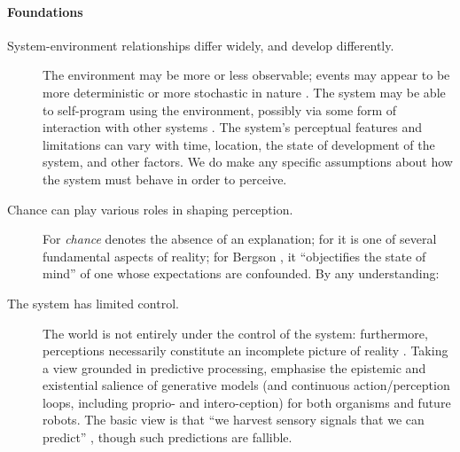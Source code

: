 
\paragraph{\textbf{\upshape Foundations}}

\begin{description}
\item[System-environment relationships differ widely, and develop
  differently.]  The environment may be more or less observable;
  events may appear to be more deterministic or more stochastic in
  nature \cite[pp.~42--44]{russel2003artificial}. The system may be
  able to self-program using the environment, possibly via some form
  of interaction with other systems
  \cite[esp.~p.~234]{clark1998being}.  The system's perceptual
  features and limitations can vary with time, location, the state of
  development of the system, and other factors.  We do make any
  specific assumptions about how the system must behave in order to
  perceive.
\item[Chance can play various roles in shaping perception.] For
  \citet[p.~99]{hume1904enquiry} \emph{chance} denotes the absence of
  an explanation; for \citet{peirce1931necessity} it is one of several
  fundamental aspects of reality; for Bergson
  \cite[p.~234]{bergson1983creative}, it ``objectifies the state of
  mind'' of one whose expectations are confounded.  By any
  understanding:
\item[The system has limited control.] The world is not entirely under
  the control of the system:
  furthermore,
  perceptions necessarily constitute an incomplete picture of reality
  \cite{hoffman2015interface}.
Taking a view grounded in predictive processing, \citet[pp.~2, 17--18]{10.3389/frobt.2018.00021} emphasise 
the epistemic and existential salience of generative models
(and continuous action/perception loops, including proprio- and intero-ception)
for both organisms and future robots.  The basic view is
that 
``we harvest sensory signals that we can predict'' \cite{friston2009free},
though such predictions are fallible.  
\end{description}

